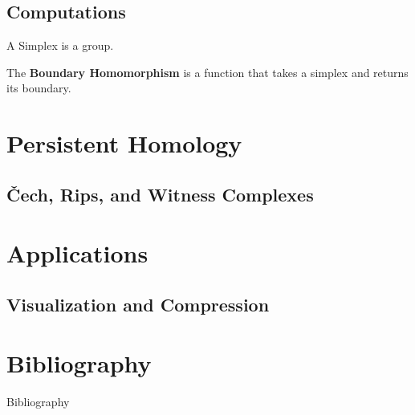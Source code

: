 \subsection{Computations}
\begin{frame}
	A Simplex is a group.
	\begin{definition}
		The \textbf{Boundary Homomorphism} is a function that takes a simplex and returns its boundary.
	\end{definition}
\end{frame}


\section[Persistence]{Persistent Homology}
\subsection{\v{C}ech, Rips, and Witness Complexes}
\begin{frame}
\end{frame}

\section{Applications}
\subsection{Visualization and Compression}
\begin{frame}
\end{frame}

\section*{Bibliography}
\begin{frame}{Bibliography}
	\nocite{wagner}
	\nocite{hatcher}
	\nocite{fraleigha}
	\nocite{singh}
	\begingroup
	\renewcommand{\section}[2]{}%
	
	\endgroup
\end{frame}





